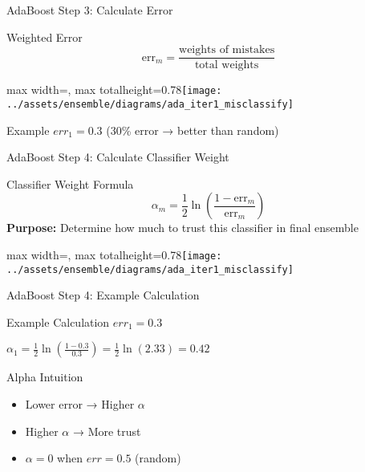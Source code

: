 \documentclass[10pt]{beamer}
\newcommand{\fitpic}[1]{\begin{adjustbox}{max width=\linewidth, max totalheight=0.78\textheight}#1\end{adjustbox}}
\begin{document}
\begin{frame}{AdaBoost Step 3: Calculate Error}
\begin{definitionbox}{Weighted Error}
$$\text{err}_m = \frac{\text{weights of mistakes}}{\text{total weights}}$$
\end{definitionbox}

\begin{center}
\fitpic{\texttt{[image: ../assets/ensemble/diagrams/ada\_iter1\_misclassify]}}
\end{center}

\begin{examplebox}{Example}
$err_1 = 0.3$ (30\% error → better than random)
\end{examplebox}
\end{frame}


\begin{frame}{AdaBoost Step 4: Calculate Classifier Weight}
\begin{definitionbox}{Classifier Weight Formula}
$$\alpha_m = \frac{1}{2}\ln\left(\frac{1 - \text{err}_m}{\text{err}_m}\right)$$
\textbf{Purpose:} Determine how much to trust this classifier in final ensemble
\end{definitionbox}

\begin{center}
\fitpic{\texttt{[image: ../assets/ensemble/diagrams/ada\_iter1\_misclassify]}}
\end{center}
\end{frame}

\begin{frame}{AdaBoost Step 4: Example Calculation}
\begin{examplebox}{Example Calculation}
$err_1 = 0.3$

$\alpha_1 = \frac{1}{2}\ln\left(\frac{1-0.3}{0.3}\right) = \frac{1}{2}\ln(2.33) = 0.42$
\end{examplebox}

\begin{keypointsbox}{Alpha Intuition}
\begin{itemize}
\item Lower error → Higher $\alpha$
\item Higher $\alpha$ → More trust
\item $\alpha = 0$ when $err = 0.5$ (random)
\end{itemize}
\end{keypointsbox}
\end{frame}
\end{document}
